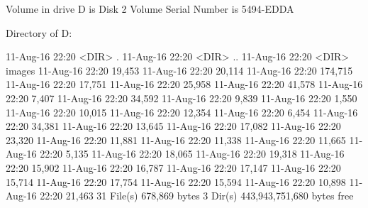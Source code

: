  Volume in drive D is Disk 2
 Volume Serial Number is 5494-EDDA

 Directory of D:\Programming\ChromeApps\eLibrary\scripts\jqwidgets\styles

11-Aug-16  22:20    <DIR>          .
11-Aug-16  22:20    <DIR>          ..
11-Aug-16  22:20    <DIR>          images
11-Aug-16  22:20            19,453 
11-Aug-16  22:20            20,114 
11-Aug-16  22:20           174,715 
11-Aug-16  22:20            17,751 
11-Aug-16  22:20            25,958 
11-Aug-16  22:20            41,578 
11-Aug-16  22:20             7,407 
11-Aug-16  22:20            34,592 
11-Aug-16  22:20             9,839 
11-Aug-16  22:20             1,550 
11-Aug-16  22:20            10,015 
11-Aug-16  22:20            12,354 
11-Aug-16  22:20             6,454 
11-Aug-16  22:20            34,381 
11-Aug-16  22:20            13,645 
11-Aug-16  22:20            17,082 
11-Aug-16  22:20            23,320 
11-Aug-16  22:20            11,881 
11-Aug-16  22:20            11,338 
11-Aug-16  22:20            11,665 
11-Aug-16  22:20             5,135 
11-Aug-16  22:20            18,065 
11-Aug-16  22:20            19,318 
11-Aug-16  22:20            15,902 
11-Aug-16  22:20            16,787 
11-Aug-16  22:20            17,147 
11-Aug-16  22:20            15,714 
11-Aug-16  22:20            17,754 
11-Aug-16  22:20            15,594 
11-Aug-16  22:20            10,898 
11-Aug-16  22:20            21,463 
              31 File(s)        678,869 bytes
               3 Dir(s)  443,943,751,680 bytes free
